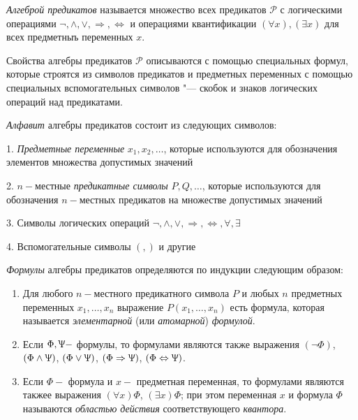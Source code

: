 \begin{definition}
    \textit{Алгеброй предикатов} называется множество всех предикатов $\mathscr{P}$ с логическими операциями $\lnot,\land,\lor,\Rightarrow,\Leftrightarrow$ и операциями квантификации $(\forall x),(\exists x)$ для всех предметныъ переменных $x$.
\end{definition}

Свойства алгебры предикатов $\mathscr{P}$ описываются с помощью специальных формул, которые строятся из символов предикатов и предметных переменных с помощью специальных вспомогательных символов "--- скобок и знаков логических операций над предикатами. 

\textit{Алфавит} алгебры предикатов состоит из следующих символов:


1. \textit{Предметные переменные} $x_1,x_2,\ldots$, которые используются для обозначения элементов множества допустимых значений

2. $n-$местные \textit{предикатные символы} $P,Q,\ldots$, которые используются для обозначения $n-$местных предикатов на множестве допустимых значений

3. Символы логических операций $\lnot,\land,\lor,\Rightarrow,\Leftrightarrow,\forall,\exists$

4. Вспомогательные символы $(,)$ и другие


\begin{definition}
    \textit{Формулы} алгебры предикатов определяются по индукции следующим образом:
    \begin{enumerate}
        \item Для любого $n-$местного предикатного символа $P$ и любых $n$ предметных переменных $x_1,\ldots,x_n$ выражение $P(x_1,\ldots,x_n)$ есть формула, которая называется \textit{элементарной} (или \textit{атомарной}) \textit{формулой}.
        \item Если $\Phi,\Uppsi - $ формулы, то формулами являются также выражения $(\lnot\Phi)$, $(\Phi\land\Uppsi)$, $(\Phi\lor\Uppsi)$, $(\Phi\Rightarrow\Uppsi)$, $(\Phi\Leftrightarrow\Uppsi)$.
        \item Если $\Phi - $ формула и $x - $ предметная переменная, то формулами являются такжее выражения $(\forall x)\Phi$, $(\exists x)\Phi$; при этом переменная $x$ и формула $\Phi$ называются \textit{областью действия} соответствующего \textit{квантора}.
    \end{enumerate}
\end{definition}

